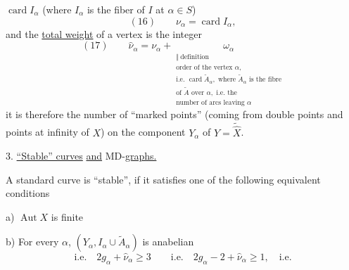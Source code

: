 $\operatorname{card}I_\alpha$ (where $I_\alpha$ is the fiber of $I$ at $\alpha\in S$)
\[
(16)\qquad\nu_\alpha=\operatorname{card}I_\alpha,
\]
and the \uline{total weight} of a vertex is the integer
\[
(17)\qquad\widehat\nu_\alpha=\nu_\alpha+
\underset{\substack{\Vert\ \mathrm{definition}\\
\text{order of the vertex }\alpha,\\
\text{i.e. }\operatorname{card}\widetilde A_\alpha,\text{ where }\widetilde A_\alpha\text{ is the fibre}\\
\text{of }\widetilde A\text{ over }\alpha,\text{ i.e. the}\\
\text{number of arcs leaving }\alpha}}{\omega_\alpha}
\]
it is therefore the number of ``marked points'' (coming from double points and points at infinity of $X$) on the component $Y_\alpha$ of $Y=\widetilde{\widehat X}$.

3. \uline{``Stable'' curves} \uline{and} MD-\uline{graphs.}

A standard curve  is ``stable'', if it satisfies one of the following equivalent conditions

a) $\operatorname{Aut}X$ is finite

b) For every $\alpha$, $(Y_\alpha,I_\alpha\cup\widetilde A_\alpha)$ is anabelian
\[
\text{i.e.}\quad 2g_\alpha+\widehat\nu_\alpha\geq3\qquad
\text{i.e.}\quad 2g_\alpha-2+\widehat\nu_\alpha\geq1,\quad\text{i.e.}
\]
